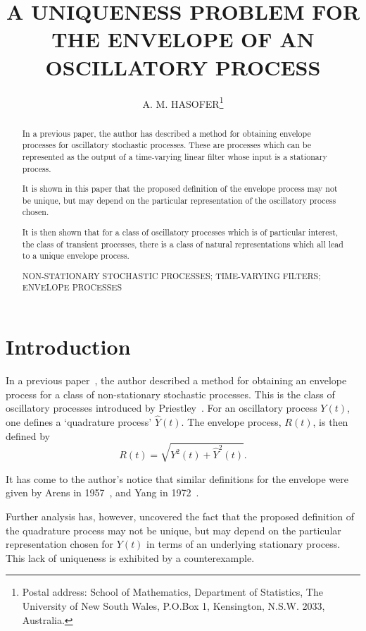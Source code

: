 \documentclass{article}
\title{A UNIQUENESS PROBLEM FOR THE ENVELOPE OF AN OSCILLATORY PROCESS}
\author{A. M. HASOFER\thanks{Postal address: School of Mathematics, Department of Statistics, The University of New South Wales, P.O.Box 1, Kensington, N.S.W. 2033, Australia.}}
\date{}
\begin{document}
\maketitle

\begin{abstract}
In a previous paper, the author has described a method for obtaining envelope processes for oscillatory stochastic processes. These are processes which can be represented as the output of a time-varying linear filter whose input is a stationary process.

It is shown in this paper that the proposed definition of the envelope process may not be unique, but may depend on the particular representation of the oscillatory process chosen.

It is then shown that for a class of oscillatory processes which is of particular interest, the class of transient processes, there is a class of natural representations which all lead to a unique envelope process.

NON-STATIONARY STOCHASTIC PROCESSES; TIME-VARYING FILTERS; ENVELOPE PROCESSES
\end{abstract}

\section*{Introduction}
In a previous paper~\cite{hasoferpetocz}, the author described a method for obtaining an envelope process for a class of non-stationary stochastic processes. This is the class of oscillatory processes introduced by Priestley~\cite{priestley}. For an oscillatory process $Y(t)$, one defines a `quadrature process' $\hat{Y}(t)$. The envelope process, $R(t)$, is then defined by
\begin{equation}
R(t) = \sqrt{Y^2(t) + \hat{Y}^2(t)}.
\label{eq:envelope}
\end{equation}

It has come to the author's notice that similar definitions for the envelope were given by Arens in 1957~\cite{arens}, and Yang in 1972~\cite{yang}.

Further analysis has, however, uncovered the fact that the proposed definition of the quadrature process may not be unique, but may depend on the particular representation chosen for $Y(t)$ in terms of an underlying stationary process. This lack of uniqueness is exhibited by a counterexample.

\end{document}
